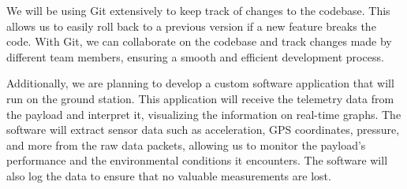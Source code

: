 We will be using Git extensively to keep track of changes to the codebase. This allows us to easily roll back to a previous version if a new feature breaks the code. With Git, we can collaborate on the codebase and track changes made by different team members, ensuring a smooth and efficient development process.



Additionally, we are planning to develop a custom software application that will run on the ground station. This application will receive the telemetry data from the payload and interpret it, visualizing the information on real-time graphs. The software will extract sensor data such as acceleration, GPS coordinates, pressure, and more from the raw data packets, allowing us to monitor the payload's performance and the environmental conditions it encounters. The software will also log the data to ensure that no valuable measurements are lost. 